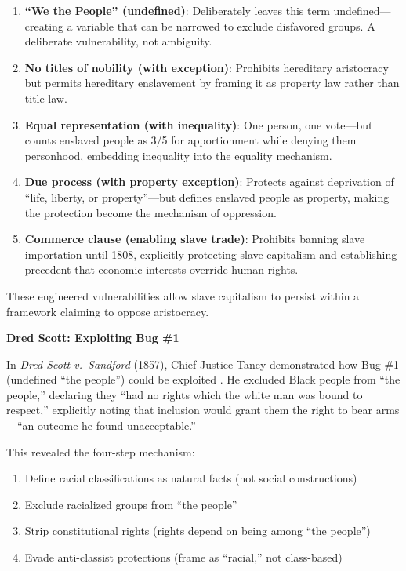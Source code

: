 \documentclass[12pt,openany]{book}
\begin{document}
\begin{enumerate}
    \item \textbf{``We the People'' (undefined)}: Deliberately leaves this term undefined---creating a variable that can be narrowed to exclude disfavored groups. A deliberate vulnerability, not ambiguity.
    
    \item \textbf{No titles of nobility (with exception)}: Prohibits hereditary aristocracy but permits hereditary enslavement by framing it as property law rather than title law.
    
    \item \textbf{Equal representation (with inequality)}: One person, one vote---but counts enslaved people as 3/5 for apportionment while denying them personhood, embedding inequality into the equality mechanism.
    
    \item \textbf{Due process (with property exception)}: Protects against deprivation of ``life, liberty, or property''---but defines enslaved people as property, making the protection become the mechanism of oppression.
    
    \item \textbf{Commerce clause (enabling slave trade)}: Prohibits banning slave importation until 1808, explicitly protecting slave capitalism and establishing precedent that economic interests override human rights.
\end{enumerate}

These engineered vulnerabilities allow slave capitalism to persist within a framework claiming to oppose aristocracy.

\textbf{Dred Scott: Exploiting Bug \#1}

In \textit{Dred Scott v.\ Sandford} (1857), Chief Justice Taney demonstrated how Bug \#1 (undefined ``the people'') could be exploited \cite{dredscott, fehrenbacher}. He excluded Black people from ``the people,'' declaring they ``had no rights which the white man was bound to respect,'' explicitly noting that inclusion would grant them the right to bear arms---``an outcome he found unacceptable.''

This revealed the four-step mechanism:
\begin{enumerate}
    \item Define racial classifications as natural facts (not social constructions)
    \item Exclude racialized groups from ``the people''
    \item Strip constitutional rights (rights depend on being among ``the people'')
    \item Evade anti-classist protections (frame as ``racial,'' not class-based)
\end{enumerate}
\end{document}
